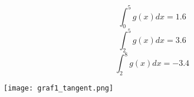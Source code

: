 \documentclass[12pt, letterpaper, twoside]{article}
\begin{document}
\begin{flushleft}
\begin{enumerate}[label=\textbf{\arabic*)}]
\begin{multicols}{2}
	$$ \int^5_0 g(x)dx = 1.6 $$
	$$ \int^5_2 g(x)dx = 3.6 $$
	$$ \int^8_2 g(x)dx = -3.4 $$

	\columnbreak

	\texttt{[image: graf1\_tangent.png]}

    \end{multicols}


\end{enumerate}

\end{flushleft}
\end{document}
